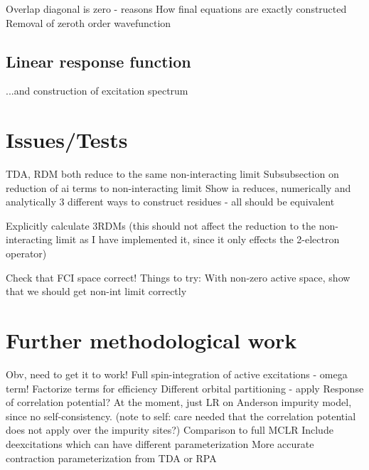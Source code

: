 \documentclass[a4paper,oneside,11pt]{article}
\numberwithin{equation}{section}
\begin{document}
Overlap diagonal is zero - reasons
How final equations are exactly constructed
Removal of zeroth order wavefunction
\subsection{Linear response function}
...and construction of excitation spectrum
\section{Issues/Tests}
TDA, RDM both reduce to the same non-interacting limit
Subsubsection on reduction of ai terms to non-interacting limit
Show ia reduces, numerically and analytically
3 different ways to construct residues - all should be equivalent

Explicitly calculate 3RDMs (this should not affect the reduction to the non-interacting limit as I have implemented it, since it only effects the 2-electron operator)

Check that FCI space correct!
Things to try: With non-zero active space, show that we should get non-int limit correctly
\section{Further methodological work}
Obv, need to get it to work!
Full spin-integration of active excitations
- omega term!
Factorize terms for efficiency
Different orbital partitioning - apply
Response of correlation potential? At the moment, just LR on Anderson impurity model, since no self-consistency. (note to self: care needed that the correlation potential does not apply over the impurity sites?)
Comparison to full MCLR
Include deexcitations which can have different parameterization
More accurate contraction parameterization from TDA or RPA
\end{document}
